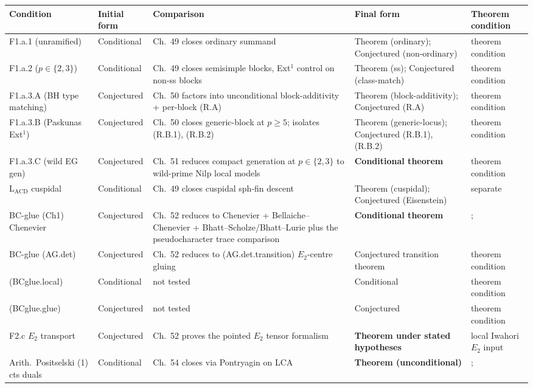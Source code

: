 \begingroup
\small
\begin{longtable}{p{}|p{}|p{}|p{}|p{}}
Condition & Initial form & Comparison & Final form & Theorem condition \\
\hline\endhead
F1.a.1 (unramified) & Conditional & Ch.~49 closes ordinary
summand & Theorem (ordinary); Conjectured (non-ordinary) & theorem condition \\
F1.a.2 (\(p\in\{2,3\}\)) & Conditional & Ch.~49 closes
semisimple blocks, Ext\({}^{1}\) control on non-ss blocks &
Theorem (ss); Conjectured (class-match) & theorem condition \\
F1.a.3.A (BH type matching) & Conjectured &
Ch.~50 factors into unconditional block-additivity + per-block
(R.A) & Theorem (block-additivity); Conjectured (R.A) & theorem condition \\
F1.a.3.B (Paskunas Ext\({}^{1}\)) & Conjectured &
Ch.~50 closes generic-block at \(p\geq 5\); isolates (R.B.1), (R.B.2)
& Theorem (generic-locus); Conjectured (R.B.1), (R.B.2) & theorem condition \\
F1.a.3.C (wild EG gen) & Conjectured &
Ch.~51 reduces compact generation at \(p\in\{2,3\}\) to wild-prime
Nilp local models &
\textbf{Conditional theorem} & theorem condition \\
\(\mathrm{L}_{\mathrm{ACD}}\) cuspidal & Conditional & Ch.~49
closes cuspidal sph-fin descent & Theorem (cuspidal); Conjectured
(Eisenstein) & separate \\
BC-glue (Ch1) Chenevier & Conjectured & Ch.~52 reduces to
Chenevier + Bellaiche--Chenevier + Bhatt--Scholze/Bhatt--Lurie plus
the pseudocharacter trace comparison & \textbf{Conditional theorem} &; \\
BC-glue (AG.det) & Conjectured & Ch.~52 reduces to
(AG.det.transition) \(E_{2}\)-centre gluing &
Conjectured transition theorem & theorem condition \\
(BCglue.local) & Conditional & not tested &
Conditional & theorem condition \\
(BCglue.glue) & Conjectured & not tested &
Conjectured & theorem condition \\
F2.c \(E_{2}\) transport & Conjectured & Ch.~52 proves the pointed
\(E_{2}\) tensor formalism & \textbf{Theorem under stated hypotheses} & local Iwahori \(E_{2}\) input \\
Arith.~Positselski (1) cts duals & Conditional & Ch.~54 closes
via Pontryagin on LCA & \textbf{Theorem (unconditional)} &; \\

\end{longtable}
